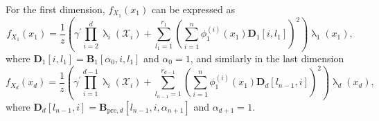 For the first dimension, $f_{X_1}(x_1)$ can be expressed as
\begin{equation}
	f_{X_1}(x_1) = \frac{1}{z} \left(\gamma^{\prime} \prod_{i=2}^{d} \uplambda_i(\mathcal{X}_i) + \sum_{l_1=1}^{r_1} \left(\sum_{i=1}^{n} \phi^{(i)}_1(x_1) \bm{D}_1[i, l_1] \right)^2 \right) \uplambda_1(x_1),
\end{equation}
where $\bm{D}_1[i, l_1] = \bm{B}_1[\alpha_0, i, l_1]$ and $\alpha_0 = 1$,
and similarly in the last dimension
\begin{equation}
	f_{X_d}(x_d) = \frac{1}{z} \left(\gamma^{\prime} \prod_{i=1}^{d-1} \uplambda_i(\mathcal{X}_i) + \sum_{l_{n-1}=1}^{r_{d-1}} \left(\sum_{i=1}^{n} \phi^{(i)}_1(x_1) \bm{D}_d[l_{n-1},i] \right)^2 \right) \uplambda_d(x_d),
\end{equation}
where $\bm{D}_d[l_{n-1},i] = \bm{B}_{\text{pre},d}[l_{n-1}, i, \alpha_{n+1}]$ and $\alpha_{d+1} = 1$.